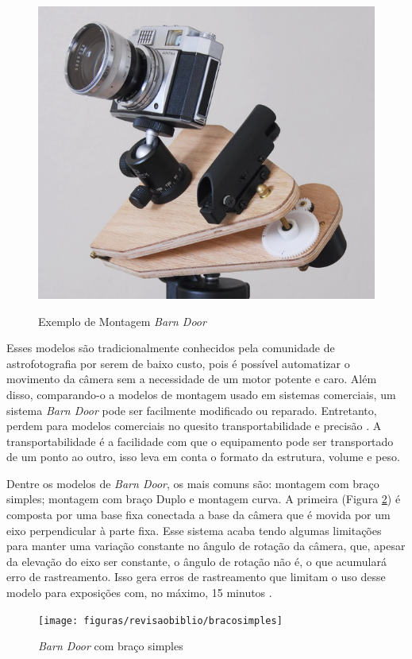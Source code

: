 \begin{figure}[!htb]
	\centering
	\caption{Exemplo de Montagem \textit{Barn Door}}
	\includegraphics[width=0.5\linewidth]{figuras/revisaobiblio/barndoorexample}
	\label{fig:barndoorexample}
\end{figure}


Esses modelos são tradicionalmente conhecidos pela comunidade de astrofotografia por serem de baixo custo, pois é possível automatizar o movimento da câmera sem a necessidade de um motor potente e caro. Além disso, comparando-o a modelos de montagem usado em sistemas comerciais, um sistema \textit{Barn Door} pode ser facilmente modificado ou reparado. Entretanto, perdem para modelos comerciais no quesito transportabilidade e precisão \cite{site:pentaxBarnDoor}. A transportabilidade é a facilidade com que o equipamento pode ser transportado de um ponto ao outro, isso leva em conta o formato da estrutura, volume e peso.
 
Dentre os modelos de \textit{Barn Door}, os mais comuns são: montagem com braço simples; montagem com braço Duplo e montagem curva. A primeira (Figura \ref{fig:singleArm}) é composta por uma base fixa conectada a base da câmera que é movida por um eixo perpendicular à parte fixa. Esse sistema acaba tendo algumas limitações para manter uma variação constante no ângulo de rotação da câmera, que, apesar da elevação do eixo ser constante, o ângulo de rotação não é, o que acumulará erro de rastreamento. Isso gera erros de rastreamento que limitam o uso desse modelo para exposições com, no máximo, 15 minutos \cite{artigo:davidtrottinventions}. 

\begin{figure}[!htb]
	\centering
	\caption{\textit{Barn Door} com braço simples}
	\texttt{[image: figuras/revisaobiblio/bracosimples]}
	\label{fig:singleArm}
\end{figure}


